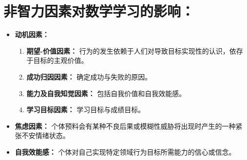 \section{非智力因素对数学学习的影响：}

    \begin{itemize}
        \item \textbf{动机因素：}
        \begin{enumerate}
            \item \textbf{期望-价值因素：} 行为的发生依赖于人们对导致目标实现性的认识，依存于目标的主观价值。
            \item \textbf{成功归因因素：} 确定成功与失败的原因。
            \item \textbf{能力及自我知觉因素：} 包括自我价值和自我效能感。
            \item \textbf{学习目标因素：} 学习目标与成绩目标。
        \end{enumerate}
        \item \textbf{焦虑因素：} 个体预料会有某种不良后果或模糊性威胁将出现时产生的一种紧张不安情绪状态。
        \item \textbf{自我效能感：} 个体对自己实现特定领域行为目标所需能力的信心或信念。
    \end{itemize}

